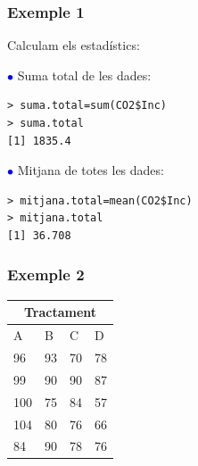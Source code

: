 \documentclass[12pt,t]{beamer}
\newcommand{\blue}[1]{\textcolor{blue}{#1}}
\theoremstyle{plain}
\theoremstyle{definition}
\begin{document}
\begin{frame}[fragile]
\frametitle{Exemple 1}
Calculam els estadístics:\medskip

\blue{$\mathbf \bullet$} Suma total de les dades:

\begin{verbatim}
> suma.total=sum(CO2$Inc)
> suma.total
[1] 1835.4
\end{verbatim}\medskip

\blue{$\mathbf \bullet$} Mitjana de totes les dades:

\begin{verbatim}
> mitjana.total=mean(CO2$Inc)
> mitjana.total
[1] 36.708
\end{verbatim}

\end{frame}


\begin{frame}
\frametitle{Exemple 2}
\begin{center}
\begin{tabular}{llll}
\multicolumn{4}{c}{Tractament}\\
\hline
A & B & C & D \\
\hline
96 & 93 & 70 &  78 \\
99 & 90 & 90 & 87 \\
100 & 75 & 84 & 57 \\
104 & 80 & 76 & 66  \\
84 & 90 & 78 & 76
\end{tabular}
\end{center}

\end{frame}
\end{document}
